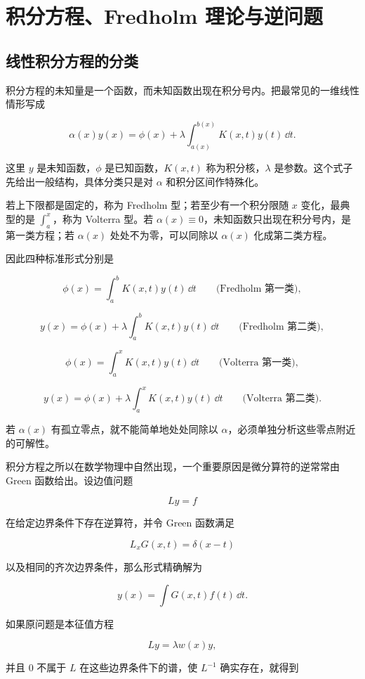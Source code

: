 \chapter{积分方程、Fredholm 理论与逆问题}
\label{chap:integral-equations}

\section{线性积分方程的分类}

积分方程的未知量是一个函数，而未知函数出现在积分号内。把最常见的一维线性情形写成

\[
\alpha(x)y(x)
=\phi(x)+\lambda\int_{a(x)}^{b(x)}K(x,t)y(t)\,\dd t.
\]

这里 $y$ 是未知函数，$\phi$ 是已知函数，$K(x,t)$ 称为积分核，$\lambda$ 是参数。这个式子先给出一般结构，具体分类只是对 $\alpha$ 和积分区间作特殊化。

若上下限都是固定的，称为 Fredholm 型；若至少有一个积分限随 $x$ 变化，最典型的是 $\int_a^x$，称为 Volterra 型。若 $\alpha(x)\equiv0$，未知函数只出现在积分号内，是第一类方程；若 $\alpha(x)$ 处处不为零，可以同除以 $\alpha(x)$ 化成第二类方程。

因此四种标准形式分别是

\[
\phi(x)=\int_a^bK(x,t)y(t)\,\dd t
\qquad\text{(Fredholm 第一类)},
\]

\[
y(x)=\phi(x)+\lambda\int_a^bK(x,t)y(t)\,\dd t
\qquad\text{(Fredholm 第二类)},
\]

\[
\phi(x)=\int_a^xK(x,t)y(t)\,\dd t
\qquad\text{(Volterra 第一类)},
\]

\[
y(x)=\phi(x)+\lambda\int_a^xK(x,t)y(t)\,\dd t
\qquad\text{(Volterra 第二类)}.
\]

若 $\alpha(x)$ 有孤立零点，就不能简单地处处同除以 $\alpha$，必须单独分析这些零点附近的可解性。

积分方程之所以在数学物理中自然出现，一个重要原因是微分算符的逆常常由 Green 函数给出。设边值问题

\[
Ly=f
\]

在给定边界条件下存在逆算符，并令 Green 函数满足

\[
L_xG(x,t)=\delta(x-t)
\]

以及相同的齐次边界条件，那么形式精确解为

\[
\boxed{
y(x)=\int G(x,t)f(t)\,\dd t
}.
\]

如果原问题是本征值方程

\[
Ly=\lambda w(x)y,
\]

并且 $0$ 不属于 $L$ 在这些边界条件下的谱，使 $L^{-1}$ 确实存在，就得到

